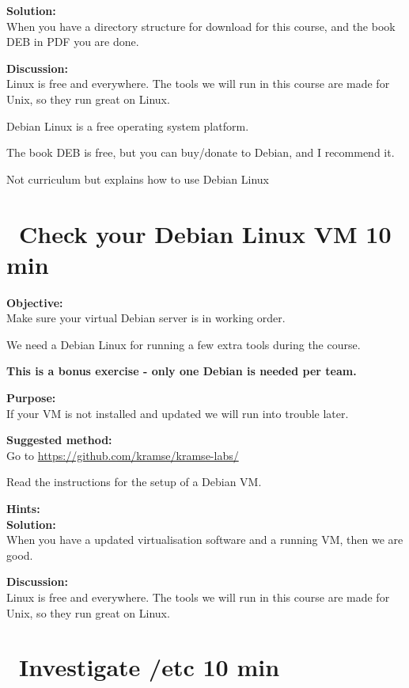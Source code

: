 \documentclass[a4paper,11pt,notitlepage]{report}
\begin{document}
{\bf Solution:}\\
When you have a directory structure for download for this course, and the book DEB in PDF you are done.

{\bf Discussion:}\\
Linux is free and everywhere. The tools we will run in this course are made for Unix, so they run great on Linux.

Debian Linux is a free operating system platform.

The book DEB is free, but you can buy/donate to Debian, and I recommend it.

Not curriculum but explains how to use Debian Linux

\chapter{\faExclamationTriangle\ Check your Debian Linux VM 10 min}
\label{ex:sw-basicDebianVM}


{\bf Objective:}\\
Make sure your virtual Debian server is in working order.

We need a Debian Linux for running a few extra tools during the course.

{\Large \bf This is a bonus exercise - only one Debian is needed per team.}

{\bf Purpose:}\\
If your VM is not installed and updated we will run into trouble later.

{\bf Suggested method:}\\
Go to \url{https://github.com/kramse/kramse-labs/}

Read the instructions for the setup of a Debian VM.

{\bf Hints:}\\

{\bf Solution:}\\
When you have a updated virtualisation software and a running VM, then we are good.

{\bf Discussion:}\\
Linux is free and everywhere. The tools we will run in this course are made for Unix, so they run great on Linux.


\chapter{\faExclamationTriangle\ Investigate /etc 10 min}
\label{ex:sw-basicLinuxetc}
\end{document}
